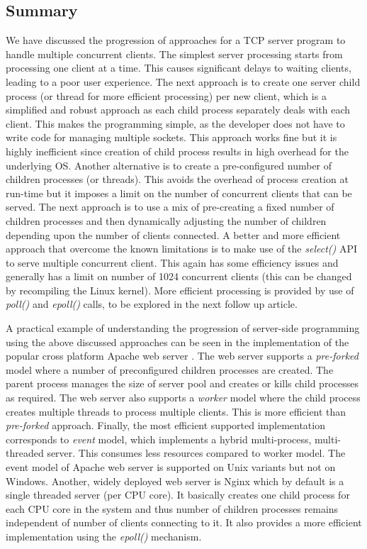 \begin{multicols}{2}
\section{Summary}

We have discussed the progression of approaches for a TCP server program to handle multiple concurrent clients. The simplest server processing starts from processing one client at a time. This causes significant delays to waiting clients, leading to a poor user experience. The next approach is to create one server child process (or thread for more efficient processing) per new client, which is a simplified and robust approach as each child process separately deals with each client. This makes the programming simple, as the developer does not have to write code for managing multiple sockets. This approach works fine but it is highly inefficient since creation of child process results in high overhead for the underlying OS. Another alternative is to create a pre-configured number of children processes (or threads). This avoids the overhead of process creation at run-time but it imposes a limit on the number of concurrent clients that can be served. The next approach is to use a mix of pre-creating a fixed number of children processes and then dynamically adjusting the number of children depending upon the number of clients connected. A better and more efficient approach that overcome the known limitations is to make use of the \textit{select()} API to serve multiple concurrent client. This again has some efficiency issues and generally has a limit on number of 1024 concurrent clients (this can be changed by recompiling the Linux kernel). More efficient processing is provided by use of \textit{poll()} and \textit{epoll()} calls, to be explored in the next follow up article.

A practical example of understanding the progression of server-side programming using the above discussed approaches can be seen in the implementation of the popular cross platform Apache web server \cite{art1-key04}. The web server supports a \textit{pre-forked} model where a number of preconfigured children processes are created. The parent process manages the size of server pool and creates or kills child processes as required. The web server also supports a \textit{worker} model where the child process creates multiple threads to process multiple clients. This is more efficient than \textit{pre-forked} approach. Finally, the most efficient supported implementation corresponds to \textit{event} model, which implements a hybrid multi-process, multi-threaded server. This consumes less resources compared to worker model. The event model of Apache web server is supported on Unix variants but not on Windows. Another, widely deployed web server is Nginx \cite{art1-key05} which by default is a single threaded server (per CPU core). It basically creates one child process for each CPU core in the system and thus number of children processes remains independent of number of clients connecting to it. It also provides a more efficient implementation using the \textit{epoll()} mechanism.


\end{multicols}
